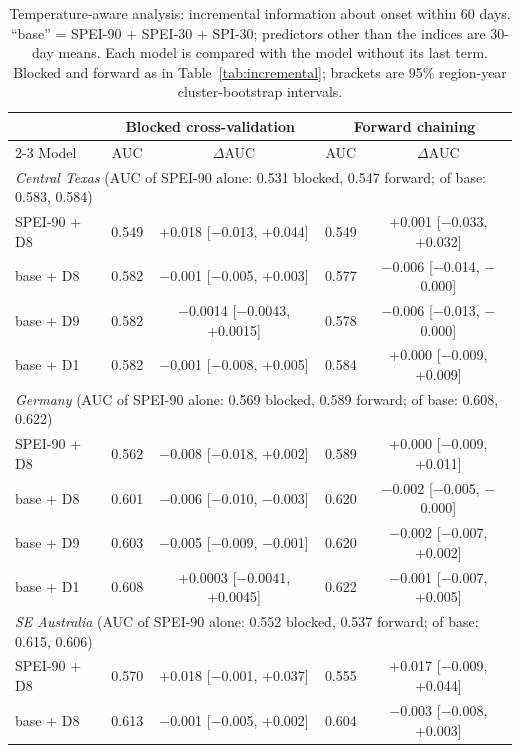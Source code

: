 \begin{table}[tbp]
\caption{Temperature-aware analysis: incremental information about onset within 60 days. ``base'' =
SPEI-90 + SPEI-30 + SPI-30; predictors other than the indices are 30-day means. Each model is compared
with the model without its last term. Blocked and forward as in Table~\ref{tab:incremental}; brackets are
95\% region-year cluster-bootstrap intervals.}
\label{tab:incrementalmv}
\footnotesize\setlength{\tabcolsep}{3pt}
\begin{tabular*}{\textwidth}{@{\extracolsep\fill}lcccc}
\toprule
& \multicolumn{2}{c}{Blocked cross-validation} & \multicolumn{2}{c}{Forward chaining}\\
\cmidrule{2-3}\cmidrule{4-5}
Model & AUC & $\Delta$AUC & AUC & $\Delta$AUC\\
\midrule
\multicolumn{5}{l}{\textit{Central Texas} (AUC of SPEI-90 alone: 0.531 blocked, 0.547 forward; of base: 0.583, 0.584)}\\
\quad SPEI-90 + D8 & 0.549 & +0.018 [$-$0.013, +0.044] & 0.549 & +0.001 [$-$0.033, +0.032] \\
\quad base + D8 & 0.582 & $-$0.001 [$-$0.005, +0.003] & 0.577 & $-$0.006 [$-$0.014, $-$0.000] \\
\quad base + D9 & 0.582 & $-$0.0014 [$-$0.0043, +0.0015] & 0.578 & $-$0.006 [$-$0.013, $-$0.000] \\
\quad base + D1 & 0.582 & $-$0.001 [$-$0.008, +0.005] & 0.584 & +0.000 [$-$0.009, +0.009] \\
\midrule
\multicolumn{5}{l}{\textit{Germany} (AUC of SPEI-90 alone: 0.569 blocked, 0.589 forward; of base: 0.608, 0.622)}\\
\quad SPEI-90 + D8 & 0.562 & $-$0.008 [$-$0.018, +0.002] & 0.589 & +0.000 [$-$0.009, +0.011] \\
\quad base + D8 & 0.601 & $-$0.006 [$-$0.010, $-$0.003] & 0.620 & $-$0.002 [$-$0.005, $-$0.000] \\
\quad base + D9 & 0.603 & $-$0.005 [$-$0.009, $-$0.001] & 0.620 & $-$0.002 [$-$0.007, +0.002] \\
\quad base + D1 & 0.608 & +0.0003 [$-$0.0041, +0.0045] & 0.622 & $-$0.001 [$-$0.007, +0.005] \\
\midrule
\multicolumn{5}{l}{\textit{SE Australia} (AUC of SPEI-90 alone: 0.552 blocked, 0.537 forward; of base: 0.615, 0.606)}\\
\quad SPEI-90 + D8 & 0.570 & +0.018 [$-$0.001, +0.037] & 0.555 & +0.017 [$-$0.009, +0.044] \\
\quad base + D8 & 0.613 & $-$0.001 [$-$0.005, +0.002] & 0.604 & $-$0.003 [$-$0.008, +0.003] \\

\end{tabular*}
\end{table}

